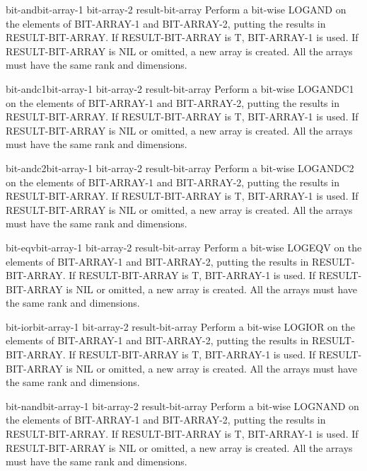 \begin{function}{bit-and}{bit-array-1 bit-array-2 \op result-bit-array}{}{}
  Perform a bit-wise LOGAND on the elements of BIT-ARRAY-1 and BIT-ARRAY-2,
  putting the results in RESULT-BIT-ARRAY. If RESULT-BIT-ARRAY is T,
  BIT-ARRAY-1 is used. If RESULT-BIT-ARRAY is NIL or omitted, a new array is
  created. All the arrays must have the same rank and dimensions.
\end{function}

\begin{function}{bit-andc1}{bit-array-1 bit-array-2 \op result-bit-array}{}{}
  Perform a bit-wise LOGANDC1 on the elements of BIT-ARRAY-1 and BIT-ARRAY-2,
  putting the results in RESULT-BIT-ARRAY. If RESULT-BIT-ARRAY is T,
  BIT-ARRAY-1 is used. If RESULT-BIT-ARRAY is NIL or omitted, a new array is
  created. All the arrays must have the same rank and dimensions.
\end{function}

\begin{function}{bit-andc2}{bit-array-1 bit-array-2 \op result-bit-array}{}{}
  Perform a bit-wise LOGANDC2 on the elements of BIT-ARRAY-1 and BIT-ARRAY-2,
  putting the results in RESULT-BIT-ARRAY. If RESULT-BIT-ARRAY is T,
  BIT-ARRAY-1 is used. If RESULT-BIT-ARRAY is NIL or omitted, a new array is
  created. All the arrays must have the same rank and dimensions.
\end{function}

\begin{function}{bit-eqv}{bit-array-1 bit-array-2 \op result-bit-array}{}{}
  Perform a bit-wise LOGEQV on the elements of BIT-ARRAY-1 and BIT-ARRAY-2,
  putting the results in RESULT-BIT-ARRAY. If RESULT-BIT-ARRAY is T,
  BIT-ARRAY-1 is used. If RESULT-BIT-ARRAY is NIL or omitted, a new array is
  created. All the arrays must have the same rank and dimensions.
\end{function}

\begin{function}{bit-ior}{bit-array-1 bit-array-2 \op result-bit-array}{}{}
  Perform a bit-wise LOGIOR on the elements of BIT-ARRAY-1 and BIT-ARRAY-2,
  putting the results in RESULT-BIT-ARRAY. If RESULT-BIT-ARRAY is T,
  BIT-ARRAY-1 is used. If RESULT-BIT-ARRAY is NIL or omitted, a new array is
  created. All the arrays must have the same rank and dimensions.
\end{function}

\begin{function}{bit-nand}{bit-array-1 bit-array-2 \op result-bit-array}{}{}
  Perform a bit-wise LOGNAND on the elements of BIT-ARRAY-1 and BIT-ARRAY-2,
  putting the results in RESULT-BIT-ARRAY. If RESULT-BIT-ARRAY is T,
  BIT-ARRAY-1 is used. If RESULT-BIT-ARRAY is NIL or omitted, a new array is
  created. All the arrays must have the same rank and dimensions.
\end{function}

